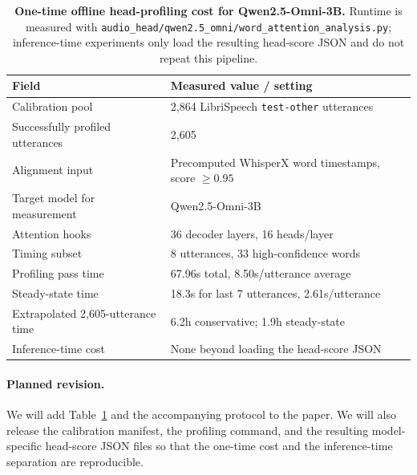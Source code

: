 \begin{answer}
    \begin{table}[t]
    \centering
    \small
    \setlength{\tabcolsep}{4pt}
    \caption{\textbf{One-time offline head-profiling cost for Qwen2.5-Omni-3B.} Runtime is measured with \texttt{audio\_head/qwen2.5\_omni/word\_attention\_analysis.py}; inference-time experiments only load the resulting head-score JSON and do not repeat this pipeline.}
    \label{tab:rebuttal-offline-profiling-cost}
    \begin{tabular}{ll}
    \toprule
    \textbf{Field} & \textbf{Measured value / setting} \\
    \midrule
    Calibration pool & 2{,}864 LibriSpeech \texttt{test-other} utterances \\
    Successfully profiled utterances & 2{,}605 \\
    Alignment input & Precomputed WhisperX word timestamps, score $\geq 0.95$ \\
    Target model for measurement & Qwen2.5-Omni-3B \\
    Attention hooks & 36 decoder layers, 16 heads/layer \\
    Timing subset & 8 utterances, 33 high-confidence words \\
    Profiling pass time & 67.96s total, 8.50s/utterance average \\
    Steady-state time & 18.3s for last 7 utterances, 2.61s/utterance \\
    Extrapolated 2{,}605-utterance time & 6.2h conservative; 1.9h steady-state \\
    Inference-time cost & None beyond loading the head-score JSON \\
    \bottomrule
    \end{tabular}
    \end{table}

    \paragraph{Planned revision.}
    We will add Table~\ref{tab:rebuttal-offline-profiling-cost} and the accompanying protocol to the paper.
    We will also release the calibration manifest, the profiling command, and the resulting model-specific head-score JSON files so that the one-time cost and the inference-time separation are reproducible.
\end{answer}

